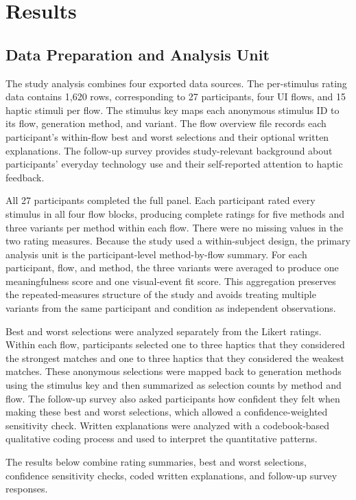 \chapter{Results}

\section{Data Preparation and Analysis Unit}

The study analysis combines four exported data sources. The per-stimulus rating data contains 1,620 rows, corresponding to 27 participants, four UI flows, and 15 haptic stimuli per flow. The stimulus key maps each anonymous stimulus ID to its flow, generation method, and variant. The flow overview file records each participant's within-flow best and worst selections and their optional written explanations. The follow-up survey provides study-relevant background about participants' everyday technology use and their self-reported attention to haptic feedback.

All 27 participants completed the full panel. Each participant rated every stimulus in all four flow blocks, producing complete ratings for five methods and three variants per method within each flow. There were no missing values in the two rating measures. Because the study used a within-subject design, the primary analysis unit is the participant-level method-by-flow summary. For each participant, flow, and method, the three variants were averaged to produce one meaningfulness score and one visual-event fit score. This aggregation preserves the repeated-measures structure of the study and avoids treating multiple variants from the same participant and condition as independent observations.

Best and worst selections were analyzed separately from the Likert ratings. Within each flow, participants selected one to three haptics that they considered the strongest matches and one to three haptics that they considered the weakest matches. These anonymous selections were mapped back to generation methods using the stimulus key and then summarized as selection counts by method and flow. The follow-up survey also asked participants how confident they felt when making these best and worst selections, which allowed a confidence-weighted sensitivity check. Written explanations were analyzed with a codebook-based qualitative coding process and used to interpret the quantitative patterns.

The results below combine rating summaries, best and worst selections, confidence sensitivity checks, coded written explanations, and follow-up survey responses.

